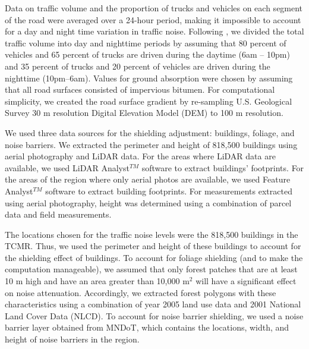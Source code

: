 \documentclass{article}\usepackage{graphicx, color}
\begin{document}
Data on traffic volume and the proportion of trucks and vehicles on each segment of the road were averaged over a 24-hour period, making it impossible to account for a day and night time variation in traffic noise. Following \citet{Arditi2007}, we divided the total traffic volume into day and nighttime periods by assuming that 80 percent of vehicles and 65 percent of trucks are driven during the daytime (6am -- 10pm) and 35 percent of trucks and 20 percent of vehicles are driven during the nighttime (10pm--6am). Values for ground absorption were chosen by assuming that all road surfaces consisted of impervious bitumen. For computational simplicity, we created the road surface gradient by re-sampling U.S. Geological Survey 30 m resolution Digital Elevation Model (DEM) to 100 m resolution. 

We used three data sources for the shielding adjustment: buildings, foliage, and noise barriers. We extracted the perimeter and height of 818,500 buildings using aerial photography and LiDAR data. For the areas where LiDAR data are available, we used LiDAR Analyst$^{TM}$ software to extract buildings’ footprints. For the areas of the region where only aerial photos are available, we used Feature Analyst$^{TM}$ software to extract building footprints. For measurements extracted using aerial photography, height was determined using a combination of parcel data and field measurements. 

The locations chosen for the traffic noise levels were the 818,500 buildings in the TCMR. Thus, we used the perimeter and height of these buildings to account for the shielding effect of buildings. To account for foliage shielding (and to make the computation manageable), we assumed that only forest patches that are at least 10 m high and have an area greater than 10,000 m$^2$ will have a significant effect on noise attenuation. Accordingly, we extracted forest polygons with these characteristics using a combination of year 2005 land use data and 2001 National Land Cover Data (NLCD). To account for noise barrier shielding, we used a noise barrier layer obtained from MNDoT, which contains the locations, width, and height of noise barriers in the region.
\end{document}
